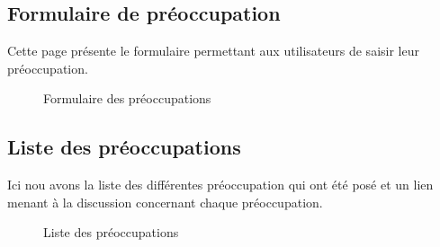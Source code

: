 \subsection{Formulaire de préoccupation}
Cette page présente le formulaire permettant aux utilisateurs de saisir leur préoccupation.

\begin{figure}[H]%
    \center%
    \setlength{\fboxsep}{5pt}%
    \setlength{\fboxrule}{0.5pt}%
    \caption{Formulaire des préoccupations}%
\end{figure}

\subsection{Liste des préoccupations}
Ici nou avons la liste des différentes préoccupation qui ont été posé et un lien menant à la discussion concernant chaque préoccupation.

\begin{figure}[H]%
    \center%
    \setlength{\fboxsep}{5pt}%
    \setlength{\fboxrule}{0.5pt}%
    \caption{Liste des préoccupations}%
\end{figure}

